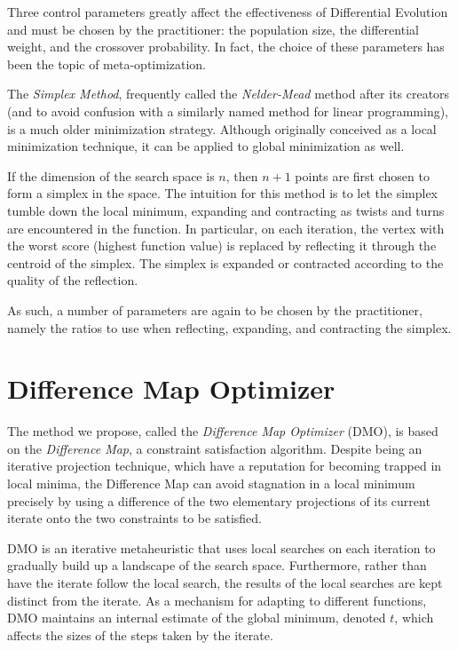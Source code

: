 \documentclass[12pt]{article}
\begin{document}
    Three control parameters greatly affect the effectiveness of Differential
    Evolution and must be chosen by the practitioner\cite{storn1997}: the
    population size, the differential weight, and the crossover probability.
    In fact, the choice of these parameters has been the topic of
    meta-optimization\cite{pedersen2010}.

    The \emph{Simplex Method}\cite{nelder1965}, frequently called the
    \emph{Nelder-Mead} method after its creators (and to avoid confusion with a
    similarly named method for linear programming), is a much older
    minimization strategy. Although originally conceived as a local
    minimization technique, it can be applied to global minimization as well.

    If the dimension of the search space is $n$, then $n+1$ points are first
    chosen to form a simplex in the space. The intuition for this method is to
    let the simplex tumble down the local minimum, expanding and contracting as
    twists and turns are encountered in the function. In particular, on each
    iteration, the vertex with the worst score (highest function value) is
    replaced by reflecting it through the centroid of the simplex. The simplex
    is expanded or contracted according to the quality of the reflection.

    As such, a number of parameters are again to be chosen by the practitioner,
    namely the ratios to use when reflecting, expanding, and contracting the
    simplex.


\section{Difference Map Optimizer}
    The method we propose, called the \emph{Difference Map Optimizer} (DMO), is
    based on the \emph{Difference Map}\cite{elser2007}, a constraint
    satisfaction algorithm.
    Despite being an iterative projection technique, which have a reputation
    for becoming trapped in local minima, the Difference Map can avoid
    stagnation in a local minimum precisely by using a difference of the two
    elementary projections of its current iterate onto the two constraints to
    be satisfied.

    DMO is an iterative metaheuristic that uses local searches on each
    iteration to gradually build up a landscape of the search space.
    Furthermore, rather than have the iterate follow the local search, the
    results of the local searches are kept distinct from the iterate.
    As a mechanism for adapting to different functions, DMO maintains an
    internal estimate of the global minimum, denoted $t$, which affects the
    sizes of the steps taken by the iterate.
\end{document}
